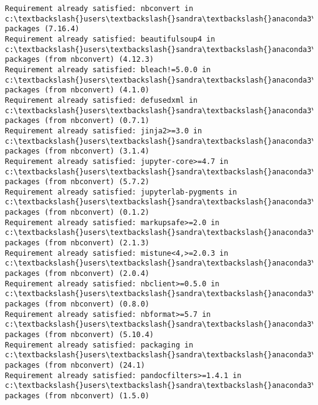 \documentclass[11pt]{article}
\begin{document}
    \begin{Verbatim}[commandchars=\\\{\}]
Requirement already satisfied: nbconvert in c:\textbackslash{}users\textbackslash{}sandra\textbackslash{}anaconda3\textbackslash{}lib\textbackslash{}site-
packages (7.16.4)
Requirement already satisfied: beautifulsoup4 in
c:\textbackslash{}users\textbackslash{}sandra\textbackslash{}anaconda3\textbackslash{}lib\textbackslash{}site-packages (from nbconvert) (4.12.3)
Requirement already satisfied: bleach!=5.0.0 in
c:\textbackslash{}users\textbackslash{}sandra\textbackslash{}anaconda3\textbackslash{}lib\textbackslash{}site-packages (from nbconvert) (4.1.0)
Requirement already satisfied: defusedxml in c:\textbackslash{}users\textbackslash{}sandra\textbackslash{}anaconda3\textbackslash{}lib\textbackslash{}site-
packages (from nbconvert) (0.7.1)
Requirement already satisfied: jinja2>=3.0 in
c:\textbackslash{}users\textbackslash{}sandra\textbackslash{}anaconda3\textbackslash{}lib\textbackslash{}site-packages (from nbconvert) (3.1.4)
Requirement already satisfied: jupyter-core>=4.7 in
c:\textbackslash{}users\textbackslash{}sandra\textbackslash{}anaconda3\textbackslash{}lib\textbackslash{}site-packages (from nbconvert) (5.7.2)
Requirement already satisfied: jupyterlab-pygments in
c:\textbackslash{}users\textbackslash{}sandra\textbackslash{}anaconda3\textbackslash{}lib\textbackslash{}site-packages (from nbconvert) (0.1.2)
Requirement already satisfied: markupsafe>=2.0 in
c:\textbackslash{}users\textbackslash{}sandra\textbackslash{}anaconda3\textbackslash{}lib\textbackslash{}site-packages (from nbconvert) (2.1.3)
Requirement already satisfied: mistune<4,>=2.0.3 in
c:\textbackslash{}users\textbackslash{}sandra\textbackslash{}anaconda3\textbackslash{}lib\textbackslash{}site-packages (from nbconvert) (2.0.4)
Requirement already satisfied: nbclient>=0.5.0 in
c:\textbackslash{}users\textbackslash{}sandra\textbackslash{}anaconda3\textbackslash{}lib\textbackslash{}site-packages (from nbconvert) (0.8.0)
Requirement already satisfied: nbformat>=5.7 in
c:\textbackslash{}users\textbackslash{}sandra\textbackslash{}anaconda3\textbackslash{}lib\textbackslash{}site-packages (from nbconvert) (5.10.4)
Requirement already satisfied: packaging in c:\textbackslash{}users\textbackslash{}sandra\textbackslash{}anaconda3\textbackslash{}lib\textbackslash{}site-
packages (from nbconvert) (24.1)
Requirement already satisfied: pandocfilters>=1.4.1 in
c:\textbackslash{}users\textbackslash{}sandra\textbackslash{}anaconda3\textbackslash{}lib\textbackslash{}site-packages (from nbconvert) (1.5.0)

\end{Verbatim}
\end{document}

